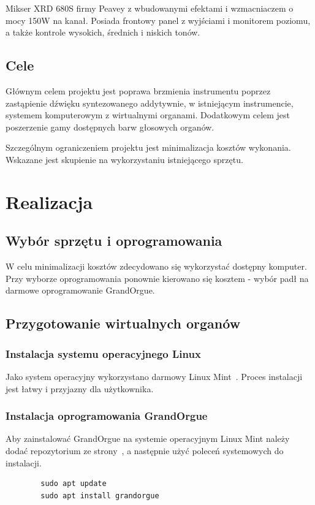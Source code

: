 \documentclass[11pt]{report}
\begin{document}
    Mikser XRD 680S firmy Peavey z wbudowanymi efektami i wzmacniaczem o mocy 150W na kanał.
    Posiada frontowy panel z wyjściami i monitorem poziomu, a także kontrole wysokich, średnich i niskich tonów.


    \section{Cele}\label{sec:cele}
    Głównym celem projektu jest poprawa brzmienia instrumentu poprzez zastąpienie dźwięku syntezowanego addytywnie,
    w istniejącym instrumencie, systemem komputerowym z wirtualnymi organami.
    Dodatkowym celem jest poszerzenie gamy dostępnych barw głosowych organów.

    Szczególnym ograniczeniem projektu jest minimalizacja kosztów wykonania.
    Wskazane jest skupienie na wykorzystaniu istniejącego sprzętu.


    \chapter{Realizacja}


    \section{Wybór sprzętu i oprogramowania}
    W celu minimalizacji kosztów zdecydowano się wykorzystać dostępny komputer.
    Przy wyborze oprogramowania ponownie kierowano się kosztem - wybór padł na darmowe oprogramowanie GrandOrgue.


    \section{Przygotowanie wirtualnych organów}

    \subsection{Instalacja systemu operacyjnego Linux}
    Jako system operacyjny wykorzystano darmowy Linux Mint~\cite{mint}.
    Proces instalacji jest łatwy i przyjazny dla użytkownika.

    \subsection{Instalacja oprogramowania GrandOrgue}
    Aby zainstalować GrandOrgue na systemie operacyjnym Linux Mint należy dodać repozytorium ze strony~\cite{grandorgueRepo},
    a następnie użyć poleceń systemowych do instalacji.
    \begin{verbatim}
        sudo apt update
        sudo apt install grandorgue
    \end{verbatim}
\end{document}
